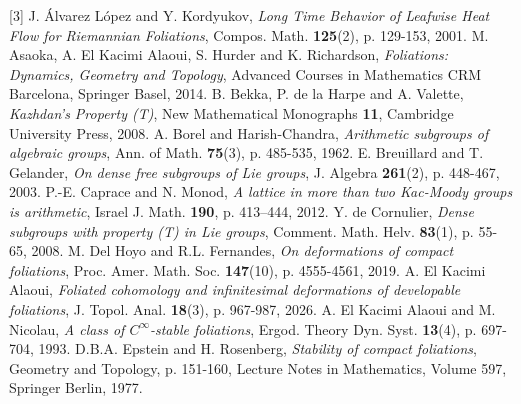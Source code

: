 \documentclass[11pt, letterpaper, oneside,reqno]{amsart}
\theoremstyle{plain}
\theoremstyle{underline}
\theoremstyle{definition}
\theoremstyle{remark}
\begin{document}
		\begin{thebibliography}{[3]}
			 J. \'{A}lvarez L\'{o}pez and Y. Kordyukov, \textit{Long Time Behavior of Leafwise Heat Flow for Riemannian Foliations}, Compos. Math. \textbf{125}(2), p. 129-153, 2001.
			 M. Asaoka, A. El Kacimi Alaoui, S. Hurder and K. Richardson, \textit{Foliations: Dynamics, Geometry and Topology}, Advanced Courses in Mathematics CRM Barcelona, Springer Basel, 2014.
			 B. Bekka, P. de la Harpe and A. Valette, \textit{Kazhdan's Property (T)}, New Mathematical Monographs \textbf{11}, Cambridge University Press, 2008.
			 A. Borel and Harish-Chandra, \textit{Arithmetic subgroups of algebraic groups}, Ann. of Math. \textbf{75}(3), p. 485-535, 1962.
			 E. Breuillard and T. Gelander, \textit{On dense free subgroups of Lie groups}, J. Algebra \textbf{261}(2), p. 448-467, 2003.
			 P.-E. Caprace and N. Monod, \textit{A lattice in more than two Kac-Moody groups is arithmetic}, Israel J. Math. \textbf{190}, p. 413–444, 2012.
			 Y. de Cornulier, \textit{Dense subgroups with property (T) in Lie groups}, Comment. Math. Helv. \textbf{83}(1), p. 55-65, 2008.
			 M. Del Hoyo and R.L. Fernandes, \textit{On deformations of compact foliations}, Proc. Amer. Math. Soc. \textbf{147}(10), p. 4555-4561, 2019.
			 A. El Kacimi Alaoui, \textit{Foliated cohomology and infinitesimal deformations of developable foliations}, J. Topol. Anal. \textbf{18}(3), p. 967-987, 2026.
			 A. El Kacimi Alaoui and M. Nicolau, \textit{A class of $C^{\infty}$-stable foliations}, Ergod. Theory Dyn. Syst. \textbf{13}(4), p. 697-704, 1993.
			 D.B.A. Epstein and H. Rosenberg, \textit{Stability of compact foliations}, Geometry and Topology, p. 151-160, Lecture Notes in Mathematics, Volume 597, Springer Berlin, 1977.

\end{thebibliography}
\end{document}
